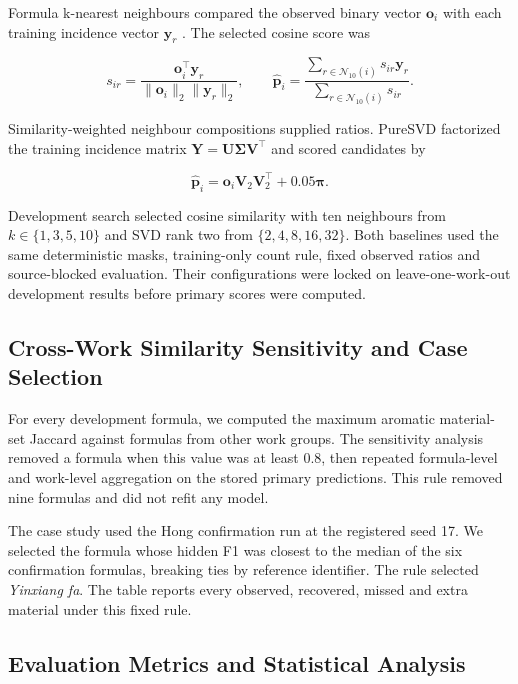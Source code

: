 \documentclass[11pt]{article}
\begin{document}
Formula k-nearest neighbours compared the observed binary vector \(\mathbf o_i\) with each training incidence vector \(\mathbf y_r\) \cite{ref16}. The selected cosine score was

\begin{equation}
\label{eq:knn-similarity}
s_{ir}=\frac{\mathbf o_i^{\top}\mathbf y_r}{\|\mathbf o_i\|_2\|\mathbf y_r\|_2},\qquad \widehat{\mathbf p}_i=\frac{\sum_{r\in\mathcal N_{10}(i)}s_{ir}\mathbf y_r}{\sum_{r\in\mathcal N_{10}(i)}s_{ir}}.
\end{equation}

Similarity-weighted neighbour compositions supplied ratios. PureSVD factorized the training incidence matrix \(\mathbf Y=\mathbf U\boldsymbol\Sigma\mathbf V^{\top}\) and scored candidates by

\begin{equation}
\label{eq:svd-baseline}
\widehat{\mathbf p}_i=\mathbf o_i\mathbf V_{2}\mathbf V_{2}^{\top}+0.05\boldsymbol\pi.
\end{equation}

Development search selected cosine similarity with ten neighbours from \(k\in\{1,3,5,10\}\) and SVD rank two from \(\{2,4,8,16,32\}\). Both baselines used the same deterministic masks, training-only count rule, fixed observed ratios and source-blocked evaluation. Their configurations were locked on leave-one-work-out development results before primary scores were computed.

\subsection{Cross-Work Similarity Sensitivity and Case Selection}

For every development formula, we computed the maximum aromatic material-set Jaccard against formulas from other work groups. The sensitivity analysis removed a formula when this value was at least 0.8, then repeated formula-level and work-level aggregation on the stored primary predictions. This rule removed nine formulas and did not refit any model.

The case study used the Hong confirmation run at the registered seed 17. We selected the formula whose hidden F1 was closest to the median of the six confirmation formulas, breaking ties by reference identifier. The rule selected \emph{Yinxiang fa}. The table reports every observed, recovered, missed and extra material under this fixed rule.

\subsection{Evaluation Metrics and Statistical Analysis}
\end{document}
